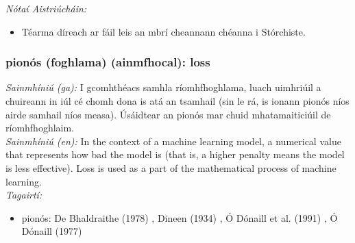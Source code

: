 \documentclass{article}
\begin{document}
 \noindent \textit{Nótaí Aistriúcháin:}
\begin{itemize}
	\item Téarma díreach ar fáil leis an mbrí cheannann chéanna i Stórchiste.
\end{itemize}


\subsubsection*{pionós (foghlama) (ainmfhocal): loss}
 \noindent \textit{Sainmhíniú (ga):} I gcomhthéacs samhla ríomhfhoghlama, luach uimhriúil a chuireann in iúl cé chomh dona is atá an tsamhail (sin le rá, is ionann pionós níos airde samhail níos measa). Úsáidtear an pionós mar chuid mhatamaiticiúil de ríomhfhoghlaim.
\\
 \noindent \textit{Sainmhíniú (en):} In the context of a machine learning model, a numerical value that represents how bad the model is (that is, a higher penalty means the model is less effective). Loss is used as a part of the mathematical process of machine learning.
\\
 \noindent \textit{Tagairtí:}
\begin{itemize}
	\item pionós: De Bhaldraithe (1978) \cite{de-bhaldraithe}, Dineen (1934) \cite{dineen}, Ó Dónaill et al. (1991) \cite{focloir-beag}, Ó Dónaill (1977) \cite{odonaill}
\end{itemize}
\end{document}
